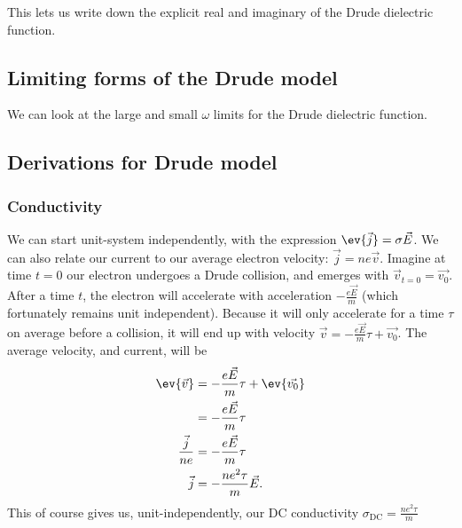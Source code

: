 \documentclass[../../main.tex]{subfiles}
\newcommand{\sigmaDC}{\sigma_{\textrm{DC}}}
\begin{document}
This lets us write down the explicit real and imaginary of the Drude dielectric function.

\subsection{Limiting forms of the Drude model}
We can look at the large and small $\omega$ limits for the Drude dielectric function.

\subsection{Derivations for Drude model}

\subsubsection{Conductivity}
We can start unit-system independently, with the expression $\ev{\vec{j}} = \sigma \vec{E}$. We can also relate our current to our average electron velocity: $\vec{j} = n e \vec{v}$. Imagine at time $t = 0$ our electron undergoes a Drude collision, and emerges with $\vec{v}_{t = 0} = \vec{v_0}$. After a time $t$, the electron will accelerate with acceleration $-\frac{e \vec{E}}{m}$ (which fortunately remains unit independent). Because it will only accelerate for a time $\tau$ on average before a collision, it will end up with velocity $\vec{v} = -\frac{e \vec{E}}{m}\tau + \vec{v_0}$. The average velocity, and current, will be 
\begin{align}
	\ev{\vec{v}} &= - \frac{e \vec{E}}{m}\tau + \ev{\vec{v_0}} \\
	&= - \frac{e \vec{E}}{m}\tau \\
	\frac{\vec{j}}{ne} &= - \frac{e \vec{E}}{m}\tau \\
	\vec{j} &= - \frac{n e^2 \tau}{m} \vec{E}.
\end{align}
This of course gives us, unit-independently, our DC conductivity $\sigmaDC = \frac{n e^2 \tau}{m}$
\end{document}
